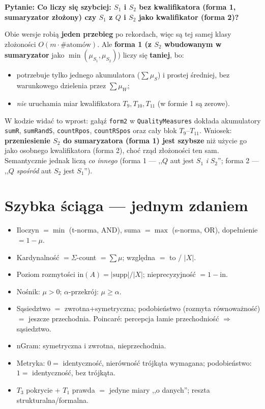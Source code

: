 \documentclass[11pt]{article}
\newcommand{\code}[1]{\texttt{#1}}
\newcommand{\inn}{\ensuremath{\mathrm{in}}}
\newcommand{\pytan}[1]{\medskip\noindent\textbf{\textcolor{anbg}{Pytanie:} #1}\par\smallskip}
\begin{document}
\pytan{Co liczy się szybciej: $S_1$ i $S_2$ bez kwalifikatora (forma 1, sumaryzator
złożony) czy $S_1$ z $Q$ i $S_2$ jako kwalifikator (forma 2)?}
Obie wersje robią \textbf{jeden przebieg} po rekordach, więc są tej samej klasy złożoności
$O(m\cdot\#\text{atomów})$. Ale \textbf{forma 1 (z $S_2$ wbudowanym w sumaryzator} jako
$\min(\mu_{S_1},\mu_{S_2})$) liczy się \textbf{taniej}, bo:
\begin{itemize}[leftmargin=*]
\item potrzebuje tylko jednego akumulatora ($\sum\mu_S$) i prostej średniej, bez
  warunkowego dzielenia przez $\sum\mu_W$;
\item \emph{nie} uruchamia miar kwalifikatora $T_9,T_{10},T_{11}$ (w formie 1 są zerowe).
\end{itemize}
W kodzie widać to wprost: gałąź \code{form2} w \code{QualityMeasures} dokłada akumulatory
\code{sumR}, \code{sumRandS}, \code{countRpos}, \code{countRSpos} oraz cały blok
$T_9$--$T_{11}$. Wniosek: \textbf{przeniesienie $S_2$ do sumaryzatora (forma 1) jest
szybsze} niż użycie go jako osobnego kwalifikatora (forma 2), choć rząd złożoności ten sam.
Semantycznie jednak liczą \emph{co innego} (forma 1 --- ,,$Q$ aut jest $S_1$ \emph{i}
$S_2$''; forma 2 --- ,,$Q$ \emph{spośród} aut $S_2$ jest $S_1$'').

\section*{Szybka ściąga --- jednym zdaniem}
\begin{itemize}[leftmargin=*,nosep]
\item Iloczyn $=\min$ (t-norma, AND), suma $=\max$ (s-norma, OR), dopełnienie $=1-\mu$.
\item Kardynalność $=\Sigma$-count $=\sum\mu$; względna $=$ to / $|X|$.
\item Poziom rozmytości $\inn(A)=|\text{supp}|/|X|$; nieprecyzyjność $=1-\inn$.
\item Nośnik: $\mu>0$; $\alpha$-przekrój: $\mu\ge\alpha$.
\item Sąsiedztwo $=$ zwrotna+symetryczna; podobieństwo (rozmyta równoważność) $=$ jeszcze
  przechodnia. Poincaré: percepcja łamie przechodniość $\Rightarrow$ sąsiedztwo.
\item nGram: symetryczna i zwrotna, nieprzechodnia.
\item Metryka: $0=$ identyczność, nierówność trójkąta wymagana; podobieństwo: $1=$
  identyczność, bez trójkąta.
\item $T_3$ pokrycie + $T_1$ prawda $=$ jedyne miary ,,o danych''; reszta strukturalna/formalna.
\end{itemize}
\end{document}
